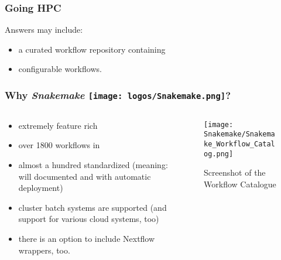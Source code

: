 \begin{frame}
  \frametitle{Going HPC}
  \pause
  Answers may include:
  \begin{itemize}[<+->]
   \item a curated workflow repository containing
   \item configurable workflows.
  \end{itemize}
\end{frame}

\begin{frame}
  \frametitle{Why \emph{Snakemake} \texttt{[image: logos/Snakemake.png]}?}
  \begin{columns}
    \begin{column}{0.5\textwidth}
      \begin{itemize}[<+->]
   \item extremely feature rich
   \item over 1800 workflows in 
   \item almost a hundred standardized (meaning: will documented and with automatic deployment)
   \item cluster batch systems are supported (and support for various cloud systems, too)
   \item there is an option to include Nextflow wrappers, too.
      \end{itemize}
    \end{column}
    \begin{column}{0.5\textwidth}
      \begin{figure}
        \texttt{[image: Snakemake/Snakemake\_Workflow\_Catalog.png]}
        \caption{Screenshot of the Workflow Catalogue}
      \end{figure}
    \end{column}
  \end{columns}
\end{frame}

